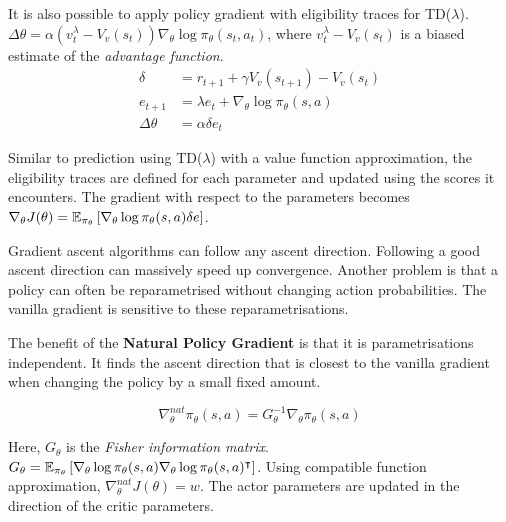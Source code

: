 It is also possible to apply policy gradient with eligibility traces for TD($\lambda$). $\Delta \theta = \alpha (v_t^\lambda - V_v(s_t)) \nabla_\theta \log \pi_\theta(s_t, a_t)$, where $v_t^\lambda - V_v(s_t)$ is a biased estimate of the \textit{advantage function}.
\begin{equation*}
	\begin{aligned}
		\delta & = r_{t+1} + \gamma V_v(s_{t+1}) - V_v(s_t)\\
		e_{t+1} & = \lambda e_t + \nabla_\theta \log \pi_\theta(s, a)\\
		\Delta \theta & = \alpha \delta e_t
	\end{aligned}
\end{equation*}

Similar to prediction using TD($\lambda$) with a value function approximation, the eligibility traces are defined for each parameter and updated using the scores it encounters. The gradient with respect to the parameters becomes $\nabla_\theta J(\theta) = \operatorname{\mathbb{E}}_{\pi_\theta} \left[\nabla_\theta \log \pi_\theta(s, a) \delta e\right]$.

Gradient ascent algorithms can follow any ascent direction. Following a good ascent direction can massively speed up convergence. Another problem is that a policy can often be reparametrised without changing action probabilities. The vanilla gradient is sensitive to these reparametrisations.

The benefit of the \textbf{Natural Policy Gradient} is that it is parametrisations independent. It finds the ascent direction that is closest to the vanilla gradient when changing the policy by a small fixed amount.

\begin{equation*}
	\nabla^{nat}_\theta \pi_\theta(s, a) = G^{-1}_\theta \nabla_\theta \pi_\theta(s, a)
\end{equation*}

Here, $G_\theta$ is the \textit{Fisher information matrix}. $G_\theta = \operatorname{\mathbb{E}}_{\pi_\theta} \left[\nabla_\theta \log \pi_\theta(s, a) \nabla_\theta \log \pi_\theta(s, a)^\intercal\right]$. Using compatible function approximation, $\nabla_\theta^{nat} J(\theta) = w$. The actor parameters are updated in the direction of the critic parameters.